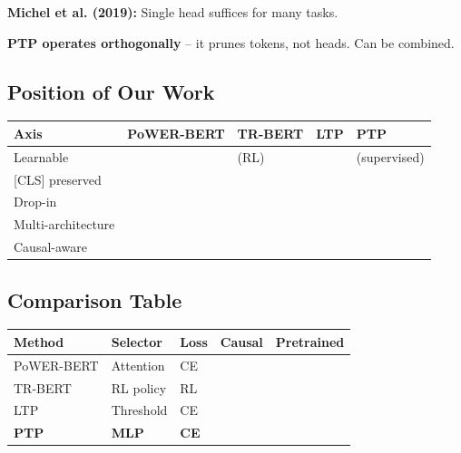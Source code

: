 \textbf{Michel et al. (2019):} Single head suffices for many tasks.

\textbf{PTP operates orthogonally} -- it prunes tokens, not heads. Can be combined.

\subsection{Position of Our Work}

\begin{table}[H]
\centering
\small
\begin{tabular}{lllll}
\toprule
\textbf{Axis} & \textbf{PoWER-BERT} & \textbf{TR-BERT} & \textbf{LTP} & \textbf{PTP} \\
\midrule
Learnable &  & (RL) &  & (supervised) \\
 {[}CLS] preserved &  &  &  &  \\
Drop-in &  &  &  &  \\
Multi-architecture &  &  &  &  \\
Causal-aware &  &  &  &  \\
\bottomrule
\end{tabular}
\end{table}

\subsection{Comparison Table}

\begin{table}[H]
\centering
\small
\begin{tabular}{lllll}
\toprule
\textbf{Method} & \textbf{Selector} & \textbf{Loss} & \textbf{Causal} & \textbf{Pretrained} \\
\midrule
PoWER-BERT & Attention & CE &  &  \\
TR-BERT & RL policy & RL &  &  \\
LTP & Threshold & CE &  &  \\
\textbf{PTP} & \textbf{MLP} & \textbf{CE} & \textbf{ } & \textbf{ } \\
\bottomrule
\end{tabular}
\end{table}

